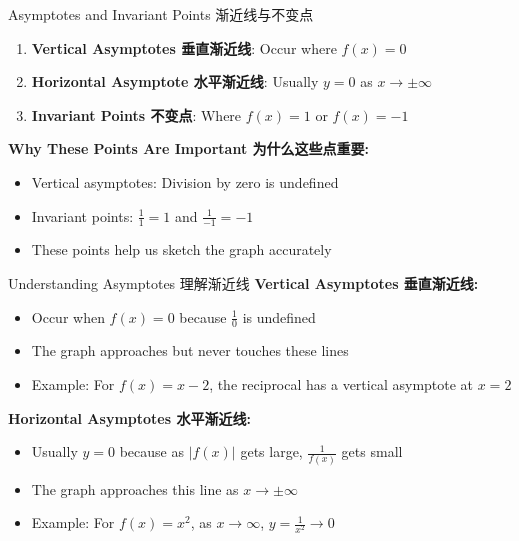\documentclass[aspectratio=169]{beamer}
\begin{document}
\begin{frame}{Asymptotes and Invariant Points 渐近线与不变点}
    \begin{tcolorbox}[colback=lightgray,colframe=primary,title=Key Concepts 关键概念]
        \footnotesize
        \begin{enumerate}
            \item \textbf{Vertical Asymptotes 垂直渐近线}: Occur where $f(x) = 0$
            \item \textbf{Horizontal Asymptote 水平渐近线}: Usually $y = 0$ as $x \to \pm\infty$
            \item \textbf{Invariant Points 不变点}: Where $f(x) = 1$ or $f(x) = -1$
        \end{enumerate}
    \end{tcolorbox}
    \vspace{1em}
    \textbf{Why These Points Are Important 为什么这些点重要:}
    \begin{itemize}
        \item Vertical asymptotes: Division by zero is undefined
        \item Invariant points: $\frac{1}{1} = 1$ and $\frac{1}{-1} = -1$
        \item These points help us sketch the graph accurately
    \end{itemize}
\end{frame}

\begin{frame}{Understanding Asymptotes 理解渐近线}
    \footnotesize
    \textbf{Vertical Asymptotes 垂直渐近线:}
    \begin{itemize}
        \item Occur when $f(x) = 0$ because $\frac{1}{0}$ is undefined
        \item The graph approaches but never touches these lines
        \item Example: For $f(x) = x - 2$, the reciprocal has a vertical asymptote at $x = 2$
    \end{itemize}
    \vspace{1em}
    \textbf{Horizontal Asymptotes 水平渐近线:}
    \begin{itemize}
        \item Usually $y = 0$ because as $|f(x)|$ gets large, $\frac{1}{f(x)}$ gets small
        \item The graph approaches this line as $x \to \pm\infty$
        \item Example: For $f(x) = x^2$, as $x \to \infty$, $y = \frac{1}{x^2} \to 0$
    \end{itemize}
\end{frame}
\end{document}
